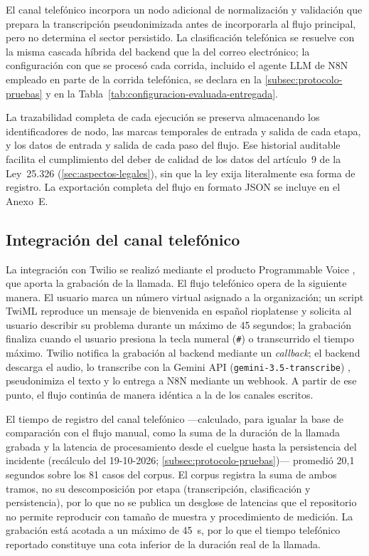 El canal telefónico incorpora un nodo adicional de normalización y validación que prepara la transcripción pseudonimizada antes de incorporarla al flujo principal, pero no determina el sector persistido. La clasificación telefónica se resuelve con la misma cascada híbrida del backend que la del correo electrónico; la configuración con que se procesó cada corrida, incluido el agente LLM de N8N empleado en parte de la corrida telefónica, se declara en la \autoref{subsec:protocolo-pruebas} y en la Tabla~\ref{tab:configuracion-evaluada-entregada}.

La trazabilidad completa de cada ejecución se preserva almacenando los identificadores de nodo, las marcas temporales de entrada y salida de cada etapa, y los datos de entrada y salida de cada paso del flujo. Ese historial auditable facilita el cumplimiento del deber de calidad de los datos del artículo~9 de la Ley~25.326 (\autoref{sec:aspectos-legales}), sin que la ley exija literalmente esa forma de registro. La exportación completa del flujo en formato JSON se incluye en el Anexo~E.

\subsection{Integración del canal telefónico}\label{subsec:integracion-canal-telefonico}

La integración con Twilio se realizó mediante el producto Programmable Voice \parencite{Twilio2026_programmable_voice}, que aporta la grabación de la llamada. El flujo telefónico opera de la siguiente manera. El usuario marca un número virtual asignado a la organización; un script TwiML reproduce un mensaje de bienvenida en español rioplatense y solicita al usuario describir su problema durante un máximo de 45 segundos; la grabación finaliza cuando el usuario presiona la tecla numeral (\texttt{\#}) o transcurrido el tiempo máximo. Twilio notifica la grabación al backend mediante un \emph{callback}; el backend descarga el audio, lo transcribe con la Gemini API (\texttt{gemini-3.5-transcribe}) \parencite{Google2026_gemini_audio}, pseudonimiza el texto y lo entrega a N8N mediante un webhook. A partir de ese punto, el flujo continúa de manera idéntica a la de los canales escritos.

El tiempo de registro del canal telefónico ---calculado, para igualar la base de comparación con el flujo manual, como la suma de la duración de la llamada grabada y la latencia de procesamiento desde el cuelgue hasta la persistencia del incidente (recálculo del 19-10-2026; \autoref{subsec:protocolo-pruebas})--- promedió 20,1 segundos sobre los 81 casos del corpus. El corpus registra la suma de ambos tramos, no su descomposición por etapa (transcripción, clasificación y persistencia), por lo que no se publica un desglose de latencias que el repositorio no permite reproducir con tamaño de muestra y procedimiento de medición. La grabación está acotada a un máximo de 45~s, por lo que el tiempo telefónico reportado constituye una cota inferior de la duración real de la llamada.

